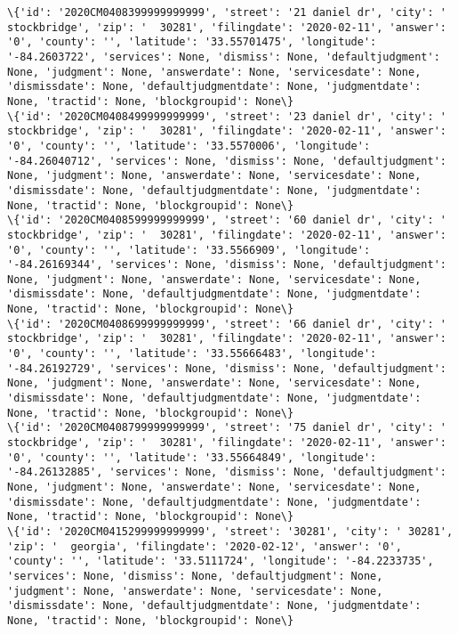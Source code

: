 \documentclass[11pt]{article}
\begin{document}
\begin{Verbatim}[commandchars=\\\{\}]
\{'id': '2020CM0408399999999999', 'street': '21 daniel dr', 'city': '  stockbridge', 'zip': '  30281', 'filingdate': '2020-02-11', 'answer': '0', 'county': '', 'latitude': '33.55701475', 'longitude': '-84.2603722', 'services': None, 'dismiss': None, 'defaultjudgment': None, 'judgment': None, 'answerdate': None, 'servicesdate': None, 'dismissdate': None, 'defaultjudgmentdate': None, 'judgmentdate': None, 'tractid': None, 'blockgroupid': None\}
\{'id': '2020CM0408499999999999', 'street': '23 daniel dr', 'city': '  stockbridge', 'zip': '  30281', 'filingdate': '2020-02-11', 'answer': '0', 'county': '', 'latitude': '33.5570006', 'longitude': '-84.26040712', 'services': None, 'dismiss': None, 'defaultjudgment': None, 'judgment': None, 'answerdate': None, 'servicesdate': None, 'dismissdate': None, 'defaultjudgmentdate': None, 'judgmentdate': None, 'tractid': None, 'blockgroupid': None\}
\{'id': '2020CM0408599999999999', 'street': '60 daniel dr', 'city': '  stockbridge', 'zip': '  30281', 'filingdate': '2020-02-11', 'answer': '0', 'county': '', 'latitude': '33.5566909', 'longitude': '-84.26169344', 'services': None, 'dismiss': None, 'defaultjudgment': None, 'judgment': None, 'answerdate': None, 'servicesdate': None, 'dismissdate': None, 'defaultjudgmentdate': None, 'judgmentdate': None, 'tractid': None, 'blockgroupid': None\}
\{'id': '2020CM0408699999999999', 'street': '66 daniel dr', 'city': '  stockbridge', 'zip': '  30281', 'filingdate': '2020-02-11', 'answer': '0', 'county': '', 'latitude': '33.55666483', 'longitude': '-84.26192729', 'services': None, 'dismiss': None, 'defaultjudgment': None, 'judgment': None, 'answerdate': None, 'servicesdate': None, 'dismissdate': None, 'defaultjudgmentdate': None, 'judgmentdate': None, 'tractid': None, 'blockgroupid': None\}
\{'id': '2020CM0408799999999999', 'street': '75 daniel dr', 'city': '  stockbridge', 'zip': '  30281', 'filingdate': '2020-02-11', 'answer': '0', 'county': '', 'latitude': '33.55664849', 'longitude': '-84.26132885', 'services': None, 'dismiss': None, 'defaultjudgment': None, 'judgment': None, 'answerdate': None, 'servicesdate': None, 'dismissdate': None, 'defaultjudgmentdate': None, 'judgmentdate': None, 'tractid': None, 'blockgroupid': None\}
\{'id': '2020CM0415299999999999', 'street': '30281', 'city': ' 30281', 'zip': '  georgia', 'filingdate': '2020-02-12', 'answer': '0', 'county': '', 'latitude': '33.5111724', 'longitude': '-84.2233735', 'services': None, 'dismiss': None, 'defaultjudgment': None, 'judgment': None, 'answerdate': None, 'servicesdate': None, 'dismissdate': None, 'defaultjudgmentdate': None, 'judgmentdate': None, 'tractid': None, 'blockgroupid': None\}

\end{Verbatim}
\end{document}
